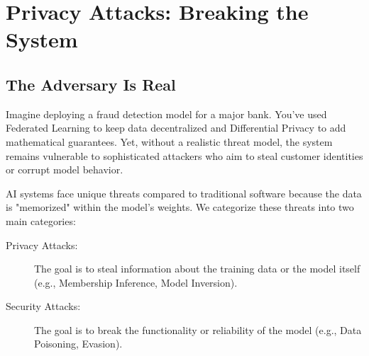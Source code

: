
\chapter{Privacy Attacks: Breaking the System}
\label{chap:privacy_attacks}


\section{The Adversary Is Real}
\label{sec:adversary_is_real}

Imagine deploying a fraud detection model for a major bank. You've used Federated Learning to keep data decentralized and Differential Privacy to add mathematical guarantees. Yet, without a realistic threat model, the system remains vulnerable to sophisticated attackers who aim to steal customer identities or corrupt model behavior.

AI systems face unique threats compared to traditional software because the data is "memorized" within the model's weights. We categorize these threats into two main categories:

\begin{description}
  \item[Privacy Attacks:] 
        The goal is to steal information about the training data or the model itself (e.g., Membership Inference, Model Inversion).
  \item[Security Attacks:]
        The goal is to break the functionality or reliability of the model (e.g., Data Poisoning, Evasion).
\end{description}

